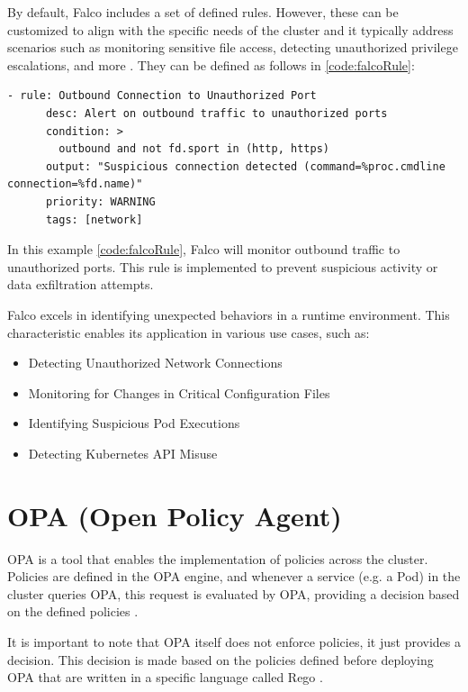 \documentclass[a4paper,11pt,openright,BCOR=15mm]{scrbook}
\begin{document}
By default, Falco includes a set of defined rules. However, these can be customized to align with the specific needs of the cluster and it typically address scenarios such as monitoring sensitive file access, detecting unauthorized privilege escalations, and more \cite{benhassan_advanced_2024}. They can be defined as follows in \ref{code:falcoRule}:

\begin{lstlisting}[style=yaml,caption={Falco rule example},label=code:falcoRule]
	- rule: Outbound Connection to Unauthorized Port
	  desc: Alert on outbound traffic to unauthorized ports
	  condition: >
		outbound and not fd.sport in (http, https)
	  output: "Suspicious connection detected (command=%proc.cmdline connection=%fd.name)"
	  priority: WARNING
	  tags: [network]
\end{lstlisting}

In this example \ref{code:falcoRule}, Falco will monitor outbound traffic to unauthorized ports. This rule is implemented to prevent suspicious activity or data exfiltration attempts.

Falco excels in identifying unexpected behaviors in a runtime environment. This characteristic enables its application in various use cases, such as:

\begin{itemize}
	\item Detecting Unauthorized Network Connections
	\item Monitoring for Changes in Critical Configuration Files
	\item Identifying Suspicious Pod Executions
	\item Detecting Kubernetes API Misuse
\end{itemize}

\section{OPA (Open Policy Agent)}\label{sect:complmentRbac}

OPA is a tool that enables the implementation of policies across the cluster. Policies are defined in the OPA engine, and whenever a service (e.g. a Pod) in the cluster queries OPA, this request is evaluated by OPA, providing a decision based on the defined policies \cite{bruner_better_2020}.

It is important to note that OPA itself does not enforce policies, it just provides a decision. This decision is made based on the policies defined before deploying OPA that are written in a specific language called Rego \cite{barua_securing_2023}.
\end{document}
